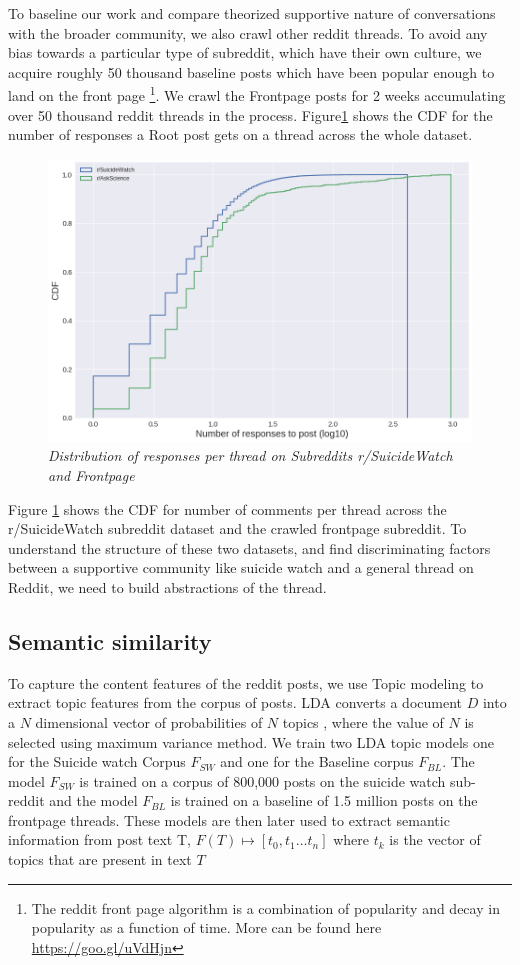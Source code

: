 To baseline our work and compare theorized supportive nature of conversations with the broader community, we also crawl other reddit threads. To avoid any bias towards a particular type of subreddit, which have their own culture, we acquire roughly 50 thousand baseline posts which have been popular enough to land on the front page \footnote{The reddit front page algorithm is a combination of popularity and decay in popularity as a function of time. More can be found here \url{https://goo.gl/uVdHjn}}. We crawl the Frontpage posts for 2 weeks accumulating over 50 thousand reddit threads in the process. Figure\ref{fig:responseDist} shows the CDF for the number of responses a Root post gets on a thread across the whole dataset. 
\begin{figure}[!htb]
	\centering
	\includegraphics[width=0.5\columnwidth]{Figures/responseDistSW}
	\caption{\textsl{ Distribution of responses per thread on Subreddits r/SuicideWatch and Frontpage }}
	\label{fig:responseDist}
\end{figure}
Figure \ref{fig:responseDist} shows the CDF for number of comments per thread across the r/SuicideWatch subreddit dataset and the crawled frontpage subreddit. 
To understand the structure of these two datasets, and find discriminating factors between a supportive community like suicide watch and a general thread on Reddit, we need to build abstractions of the thread. 

\subsection{Semantic similarity}
\label{Topic}
To capture the content features of the reddit posts, we use Topic modeling\cite{Blei2003} to extract topic features from the corpus of posts. LDA converts a document $D$ into a $N$ dimensional vector of probabilities of $N$ topics , where the value of $N$ is selected using maximum variance method\cite{Sievert2014}. We train two LDA topic models one for the Suicide watch Corpus $F_{SW}$ and one for the Baseline corpus $F_{BL}$. The model $F_{SW}$ is trained on a corpus of 800,000 posts on the suicide watch sub-reddit and the model $F_{BL}$ is trained on a baseline of 1.5 million posts on the frontpage threads. These models are then later used to extract semantic information from post text T,  $F(T) \mapsto [t_0 , t_1 \ldots t_n ]$ where $t_k$ is the vector of topics that are present in text $T$


